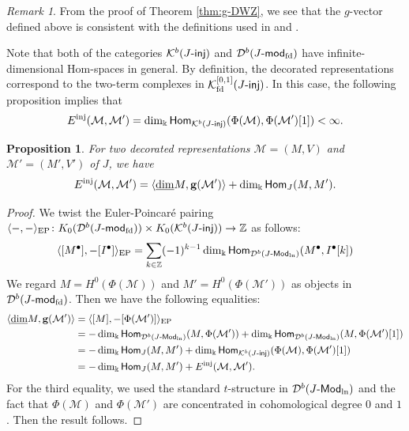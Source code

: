 \documentclass[12pt]{amsart}
\newtheorem{proposition}[theorem]{Proposition}
\theoremstyle{definition}
\theoremstyle{remark}
\newtheorem{remark}[theorem]{Remark}
\numberwithin{equation}{section}
\def\Dcal{\mathcal{D}}
\newcommand{\opname}[1]{\operatorname{\mathsf{#1}}}
\newcommand{\Hom}{\opname{Hom}}
\newcommand{\injc}{\mathchar`-\mathsf{inj}}
\newcommand{\cK}{\mathcal{K}}
\newcommand{\Modln}{\mathchar`-\mathsf{Mod}_{\mathrm{ln}}}
\newcommand{\modfd}{\mathchar`-\mathsf{mod}_{\mathrm{fd}}}
\begin{document}
\begin{remark}
From the proof of Theorem \ref{thm:g-DWZ}, we see that the $g$-vector defined above is consistent with the definitions used in \cite[(1.13)]{DWZ10} and  \cite[\S3.1]{CLS-2015}. 
\end{remark}
 
 
  Note that  both of the categories $\cK^b(J\injc)$ and $\Dcal^b(J\modfd)$ have infinite-dimensional Hom-spaces in general. By definition, the decorated representations correspond to the two-term complexes in  $\cK_{\rm fd}^{[0,1]}(J\injc)$. In this case,  the following proposition implies that
  $$E^{\rm inj}(\mathcal M,\mathcal M')=\dim_\Bbbk \Hom_{\mathcal K^{b}(J\mathchar`-\mathsf{inj})}(\Phi(\mathcal M),\Phi(\mathcal M')[1])<\infty.$$ 
 
 \begin{proposition} \label{pro:E-hom}
 For two decorated representations $\mathcal M=(M, V)$ and $\mathcal M'=(M', V')$ of $J$, we have
\begin{eqnarray}\label{eqn:e-inv-DWZ}
  E^{\rm inj}(\mathcal M,\mathcal M')=\langle\underline{\dim} M, \mathbf{g}(\mathcal{M}')\rangle + \dim_{\Bbbk} \Hom_J(M, M' ).  
\end{eqnarray}
\end{proposition}

\begin{proof}
     We twist the Euler-Poincar\'e pairing $\langle-,-\rangle_{\mathrm{EP}} \colon K_0(\mathcal{D}^b(J\modfd))\times K_0(\mathcal{K}^b(J\injc))\to \mathbb{Z}$ as follows:
    \[\langle [M^\bullet], -[I^\bullet]\rangle_{\mathrm{EP}} =\sum_{k\in \mathbb{Z}}(-1)^{k-1}\dim_{\Bbbk }\Hom_{\mathcal{D}^b(J\Modln)}(M^\bullet, I^\bullet [k])\]
    We regard  $M= H^0(\Phi(\mathcal{M}))$ and $M'= H^0(\Phi(\mathcal{M}'))$ as objects in $\mathcal{D}^b(J\modfd)$. Then we have the following equalities:
    \begin{align*}
        \langle\underline{\dim} M, \mathbf{g}(\mathcal{M}')\rangle
        &=\langle[M], -[\Phi(\mathcal{M}')]\rangle_{\mathrm{EP}}\\
        &=-\dim_{\Bbbk}\Hom_{\mathcal{D}^b(J\Modln)}(M, \Phi(\mathcal{M}'))+\dim_{\Bbbk}\Hom_{\mathcal{D}^b(J\Modln)}(M, \Phi(\mathcal{M}')[1])\\
        &=-\dim_{\Bbbk} \Hom_J(M, M' ) + \dim_{\Bbbk }\Hom_{\mathcal{K}^b(J\mathchar`-\mathsf{inj})}(\Phi(\mathcal{M}), \Phi(\mathcal{M}')[1])\\
         &=-\dim_{\Bbbk} \Hom_J(M, M' ) + E^{\rm inj}(\mathcal M,\mathcal M').
    \end{align*}
    For the third equality, we used the standard $t$-structure in $\mathcal{D}^b(J\Modln)$ and the fact that $\Phi(\mathcal{M})$ and $\Phi(\mathcal{M}')$ are concentrated in cohomological degree $0$ and $1$. Then the result follows.
\end{proof}
\end{document}
